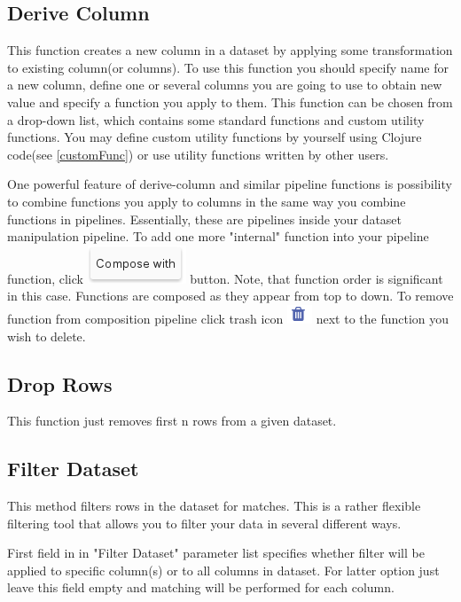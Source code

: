 \documentclass[USenglish]{article}
\begin{document}
\subsection{Derive Column}
This function creates a new column in a dataset by applying some transformation to existing column(or columns). To use this function you should specify name for a new column, define one or several columns you are going to use to obtain new value and specify a function you apply to them. This function can be chosen from a drop-down list, which contains some standard functions and custom utility functions. You may define custom utility functions by yourself using Clojure code(see \ref{customFunc}) or use utility functions written by other users.
\begin{mdframed}[hidealllines=true,backgroundcolor=gray!15]
One powerful feature of derive-column and similar pipeline functions is possibility to combine functions you apply to columns in the same way you combine functions in pipelines. Essentially, these are pipelines inside your dataset manipulation pipeline. To add one more "internal" function into your pipeline function, click {\includegraphics[scale=0.5]{compose.png}} button. Note, that function order is significant in this case. Functions are composed as they appear from top to down. To remove function from composition pipeline click trash icon {\includegraphics[scale=0.8]{trash.png}} next to the function you wish to delete.
\end{mdframed}

\subsection{Drop Rows}
This function just removes first n rows from a given dataset.
\subsection{Filter Dataset}
This method filters rows in the dataset for matches. This is a rather flexible filtering tool that allows you to filter your data in several different ways.

First field in in "Filter Dataset" parameter list specifies whether filter will be applied to specific column(s) or to all columns in dataset. For latter option just leave this field empty and matching will be performed for each column.
\end{document}
